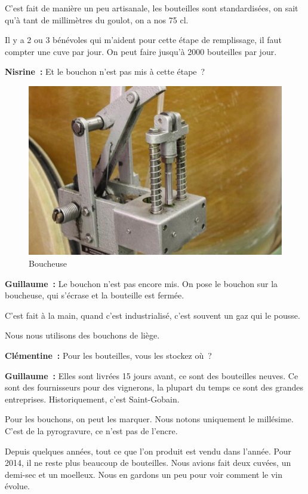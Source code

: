 \documentclass[a4paper, titlepage]{report}
\begin{document}
C'est fait de manière un peu artisanale, les bouteilles sont
standardisées, on sait qu'à tant de millimètres du goulot, on a nos 75
cl.

Il y a 2 ou 3 bénévoles qui m'aident pour cette étape de remplissage, il
faut compter une cuve par jour. On peut faire jusqu'à 2000 bouteilles
par jour.

\textbf{Nisrine~:} Et le bouchon n'est pas mis à cette étape~?

\begin{figure}[!h]
\includegraphics{Images/bouchon.jpg}
\caption{Boucheuse}
\end{figure}


\textbf{Guillaume~:} Le bouchon
n'est pas encore mis. On pose le bouchon sur la boucheuse, qui s'écrase
et la bouteille est fermée.

C'est fait à la main, quand c'est industrialisé, c'est souvent un gaz
qui le pousse.

Nous nous utilisons des bouchons de liège.

\textbf{Clémentine~:} Pour les bouteilles, vous les stockez où~?

\textbf{Guillaume~:} Elles sont livrées 15 jours avant, ce sont des
bouteilles neuves. Ce sont des fournisseurs pour des vignerons, la
plupart du temps ce sont des grandes entreprises. Historiquement, c'est
Saint-Gobain.

Pour les bouchons, on peut les marquer. Nous notons uniquement le
millésime. C'est de la pyrogravure, ce n'est pas de l'encre.

Depuis quelques années, tout ce que l'on produit est vendu dans l'année.
Pour 2014, il ne reste plus beaucoup de bouteilles. Nous avions fait
deux cuvées, un demi-sec et un moelleux. Nous en gardons un peu pour
voir comment le vin évolue.
\end{document}
